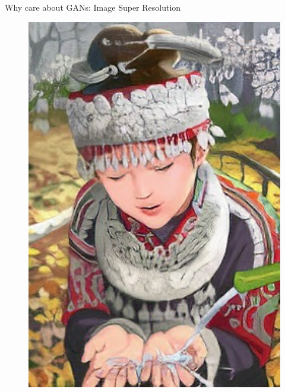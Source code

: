 \documentclass[notheorems]{beamer}
\begin{document}
\begin{frame}{Why care about GANs: Image Super Resolution}
\begin{figure}
\begin{minipage}{.3\textwidth}
            \end{minipage}
            \begin{minipage}{.3\textwidth}
                \centering
                \includegraphics[width=1\textwidth]{figures/super_res/comic_SRGAN-VGG54}
            \end{minipage}
            \begin{minipage}{.3\textwidth}
                \centering

\end{minipage}
\end{figure}
\end{frame}
\end{document}
